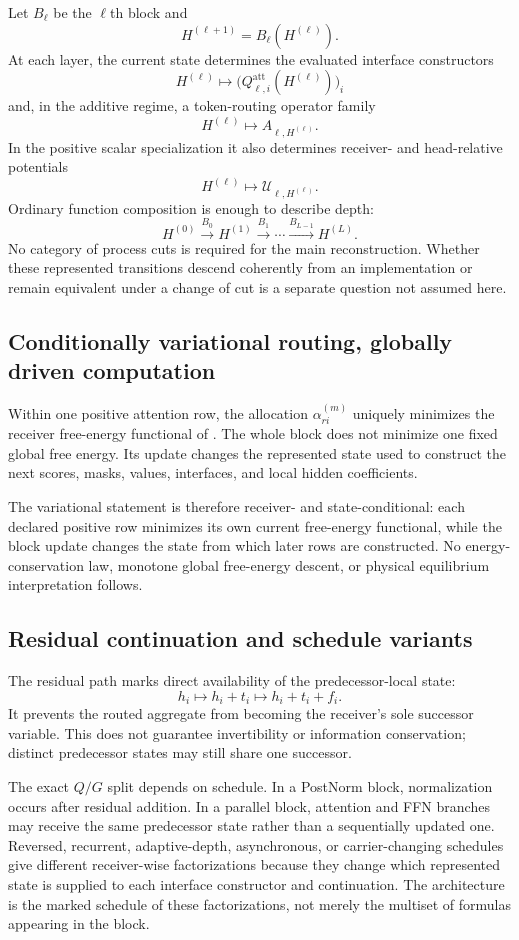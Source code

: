 Let $B_\ell$ be the $\ell$th block and
\[
H^{(\ell+1)}=B_\ell(H^{(\ell)}).
\]
At each layer, the current state determines the evaluated interface constructors
\[
H^{(\ell)}
\longmapsto
\bigl(Q_{\ell,i}^{\mathrm{att}}(H^{(\ell)})\bigr)_i
\]
and, in the additive regime, a token-routing operator family
\[
H^{(\ell)}\longmapsto A_{\ell,H^{(\ell)}}.
\]
In the positive scalar specialization it also determines receiver- and head-relative potentials
\[
H^{(\ell)}\longmapsto\mathcal U_{\ell,H^{(\ell)}}.
\]
Ordinary function composition is enough to describe depth:
\[
H^{(0)}
\xrightarrow{B_0}
H^{(1)}
\xrightarrow{B_1}
\cdots
\xrightarrow{B_{L-1}}
H^{(L)}.
\]
No category of process cuts is required for the main reconstruction. Whether these represented transitions descend coherently from an implementation or remain equivalent under a change of cut is a separate question not assumed here.

\subsection{Conditionally variational routing, globally driven computation}

Within one positive attention row, the allocation $\alpha_{ri}^{(m)}$ uniquely minimizes the receiver free-energy functional of . The whole block does not minimize one fixed global free energy. Its update changes the represented state used to construct the next scores, masks, values, interfaces, and local hidden coefficients.

The variational statement is therefore receiver- and state-conditional: each declared positive row minimizes its own current free-energy functional, while the block update changes the state from which later rows are constructed. No energy-conservation law, monotone global free-energy descent, or physical equilibrium interpretation follows.

\subsection{Residual continuation and schedule variants}

The residual path marks direct availability of the predecessor-local state:
\[
h_i\longmapsto h_i+t_i\longmapsto h_i+t_i+f_i.
\]
It prevents the routed aggregate from becoming the receiver's sole successor variable. This does not guarantee invertibility or information conservation; distinct predecessor states may still share one successor.

The exact $Q/G$ split depends on schedule. In a PostNorm block, normalization occurs after residual addition. In a parallel block, attention and FFN branches may receive the same predecessor state rather than a sequentially updated one. Reversed, recurrent, adaptive-depth, asynchronous, or carrier-changing schedules give different receiver-wise factorizations because they change which represented state is supplied to each interface constructor and continuation. The architecture is the marked schedule of these factorizations, not merely the multiset of formulas appearing in the block.
